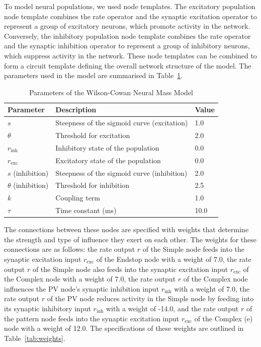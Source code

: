 \documentclass[12pt]{article}
\begin{document}
To model neural populations, we used node templates. The excitatory population node template combines the rate operator and the synaptic excitation operator to represent a group of excitatory neurons, which promote activity in the network. Conversely, the inhibitory population node template combines the rate operator and the synaptic inhibition operator to represent a group of inhibitory neurons, which suppress activity in the network. These node templates can be combined to form a circuit template defining the overall network structure of the model. The parameters used in the model are summarised in Table~\ref{tab:parameters}. \par

\begin{table}[H]
  \centering
  \caption{Parameters of the Wilson-Cowan Neural Mass Model}
  \label{tab:parameters}
  \begin{tabular}{@{}lll@{}}
      \toprule
      \textbf{Parameter} & \textbf{Description} & \textbf{Value} \\ \midrule
      \( s \) & Steepness of the sigmoid curve (excitation) & 1.0 \\
      \( \theta \) & Threshold for excitation & 2.0 \\
      \( r_{\mathrm{inh}} \) & Inhibitory state of the population & 0.0 \\
      \( r_{\mathrm{exc}} \) & Excitatory state of the population & 0.0 \\
      \( s \) (inhibition) & Steepness of the sigmoid curve (inhibition) & 2.0 \\
      \( \theta \) (inhibition) & Threshold for inhibition & 2.5 \\
      \( k \) & Coupling term & 1.0 \\
      \( \tau \) & Time constant (ms) & 10.0 \\ \bottomrule
  \end{tabular}
\end{table}

The connections between these nodes are specified with weights that determine the strength and type of influence they exert on each other. The weights for these connections are as follows: the rate output \( r \) of the Simple node feeds into the synaptic excitation input \( r_{\mathrm{exc}} \) of the Endstop node with a weight of 7.0, the rate output \( r \) of the Simple node also feeds into the synaptic excitation input \( r_{\mathrm{exc}} \) of the Complex node with a weight of 7.0, the rate output \( r \) of the Complex node influences the PV node's synaptic inhibition input \( r_{\mathrm{inh}} \) with a weight of 7.0, the rate output \( r \) of the PV node reduces activity in the Simple node by feeding into its synaptic inhibitory input \( r_{\mathrm{inh}} \) with a weight of -14.0, and the rate output \( r \) of the pattern node feeds into the synaptic excitation input \( r_{\mathrm{exc}} \) of the Complex (e) node with a weight of 12.0. The specifications of these weights are outlined in Table~\ref{tab:weights}. \par
\end{document}
